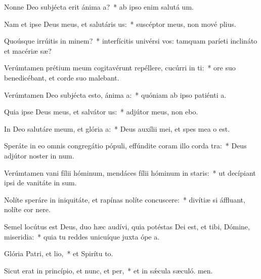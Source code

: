\item Nonne Deo subjécta erit ánima a?~* ab ipso enim salutá um.
\item Nam et ipse Deus meus, et salutáris us:~* suscéptor meus, non mové plius.
\item Quoúsque irrúitis in minem?~* interfícitis univérsi vos: tamquam paríeti inclináto et macériæ sæ?
\item Verúmtamen prétium meum cogitavérunt repéllere, cucúrri in ti:~* ore suo benedicébant, et corde suo malebant.
\item Verúmtamen Deo subjécta esto, ánima a:~* quóniam ab ipso patiénti a.
\item Quia ipse Deus meus, et salvátor us:~* adjútor meus, non ebo.
\item In Deo salutáre meum, et glória a:~* Deus auxílii mei, et spes mea  o est.
\item Speráte in eo omnis congregátio pópuli, effúndite coram illo corda tra:~* Deus adjútor noster in num.
\item Verúmtamen vani fílii hóminum, mendáces fílii hóminum in staris:~* ut decípiant ipsi de vanitáte in sum.
\item Nolíte speráre in iniquitáte, et rapínas nolíte concuscere:~* divítiæ si áffluant, nolíte cor nere.
\item Semel locútus est Deus, duo hæc audívi, quia potéstas Dei est, et tibi, Dómine, miseridia:~* quia tu reddes unicuíque juxta ópe a.
\item Glória Patri, et lio,~* et Spirítu to.
\item Sicut erat in princípio, et nunc, et per,~* et in sǽcula sæculó. men.
